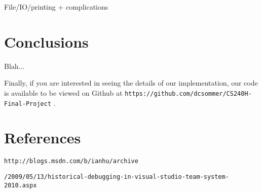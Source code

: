 \documentclass[letterpaper, 10pt]{article}
\newcommand{\ttt}{\texttt}
\begin{document}
File/IO/printing + complications

\section{Conclusions}
Blah...

Finally, if you are interested in seeing the details of our
implementation, our code is available to be viewed on Github at
\ttt{https://github.com/dcsommer/CS240H-Final-Project} .

\section{References}
\begin{enumerate}[{[}1{]}]

\item
\ttt{http://blogs.msdn.com/b/ianhu/archive}

\ttt{/2009/05/13/historical-debugging-in-visual-studio-team-system-2010.aspx}

\item


\item


\end{enumerate}
\end{document}
